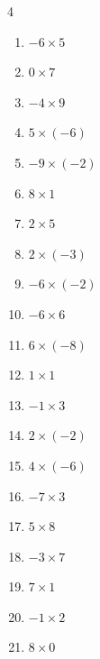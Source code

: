 \begin{multicols}{4}
\begin{enumerate}
  \item $-6\times 5$
        \phantom{$=-30$}

  \item $0\times 7$
        \phantom{$=0$}

  \item $-4\times 9$
        \phantom{$=-36$}

  \item $5\times (-6)$
        \phantom{$=-30$}

  \item $-9\times (-2)$
        \phantom{$=18$}

  \item $8\times 1$
        \phantom{$=8$}

  \item $2\times 5$
        \phantom{$=10$}

  \item $2\times (-3)$
        \phantom{$=-6$}

  \item $-6\times (-2)$
        \phantom{$=12$}

  \item $-6\times 6$
        \phantom{$=-36$}

  \item $6\times (-8)$
        \phantom{$=-48$}

  \item $1\times 1$
        \phantom{$=1$}

  \item $-1\times 3$
        \phantom{$=-3$}

  \item $2\times (-2)$
        \phantom{$=-4$}

  \item $4\times (-6)$
        \phantom{$=-24$}

  \item $-7\times 3$
        \phantom{$=-21$}

  \item $5\times 8$
        \phantom{$=40$}

  \item $-3\times 7$
        \phantom{$=-21$}

  \item $7\times 1$
        \phantom{$=7$}

  \item $-1\times 2$
        \phantom{$=-2$}

  \item $8\times 0$
        \phantom{$=0$}


\end{enumerate}
\end{multicols}

